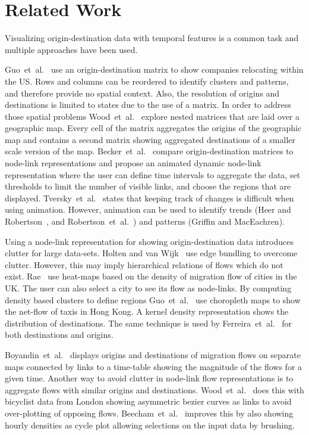 \documentclass[a4paper,twocolumn]{article}
\author{Josua Krause}
\begin{document}
\section*{Related Work}
Visualizing origin-destination data with temporal features
is a common task and multiple approaches have been used.

Guo~et~al.~\cite{Guo2006} use an origin-destination matrix
to show companies relocating within the US.
Rows and columns can be reordered to identify clusters
and patterns, and therefore provide no spatial context.
Also, the resolution of origins and destinations is limited
to states due to the use of a matrix.
In order to address those spatial problems
Wood~et~al.~\cite{Wood2002} explore nested matrices
that are laid over a geographic map.
Every cell of the matrix aggregates the origins
of the geographic map and contains
a second matrix showing aggregated destinations of
a smaller scale version of the map.
Becker~et~al.~\cite{Becker1995} compare
origin-destination matrices to node-link representations
and propose an animated dynamic node-link representation
where the user can define time intervals to aggregate the data,
set thresholds to limit the number of visible links,
and choose the regions that are displayed.
Tversky~et~al.~\cite{Tversky2002} states that
keeping track of changes is difficult when using
animation. However, animation can be used to
identify trends (Heer and Robertson~\cite{Heer2007},
and Robertson~et~al.~\cite{Robertson}) and
patterns (Griffin and MacEachren\cite{Griffin2006}).

Using a node-link representation for showing origin-destination
data introduces clutter for large data-sets.
Holten and van Wijk~\cite{Holten2009} use edge bundling
to overcome clutter. However, this may imply hierarchical
relations of flows which do not exist.
Rae~\cite{Rae2009} use heat-maps based on
the density of migration flow of cities in the UK.
The user can also select a city to see its flow as node-links.
By computing density based clusters to define regions
Guo~et~al.~\cite{Guo2012} use choropleth maps to show
the net-flow of taxis in Hong Kong.
A kernel density representation shows the distribution
of destinations.
The same technique is used by Ferreira~et~al.~\cite{Ferreira2013}
for both destinations and origins.

Boyandin~et~al.~\cite{Boyandin2011} displays origins and
destinations of migration flows on separate maps connected
by links to a time-table showing the magnitude of the flows
for a given time.
Another way to avoid clutter in node-link
flow representations is to aggregate flows with
similar origins and destinations.
Wood~et~al.~\cite{Wood2011} does this with bicyclist data
from London showing asymmetric bezier curves as links to avoid
over-plotting of opposing flows.
Beecham~et~al.~\cite{Beecham2012} improves
this by also showing hourly densities as cycle
plot allowing selections on the input data by brushing.



\end{document}
